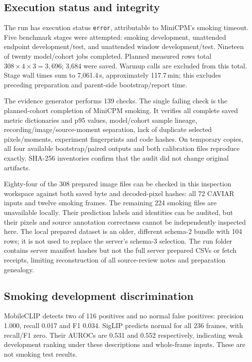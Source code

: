 \documentclass[11pt,a4paper]{article}
\newcommand{\code}[1]{\nolinkurl{#1}}
\begin{document}
\subsection{Execution status and integrity}
The run has execution status \code{error}, attributable to MiniCPM's smoking timeout. Five benchmark stages were attempted: smoking development, unattended endpoint development/test, and unattended window development/test. Nineteen of twenty model/cohort jobs completed. Planned measured rows total $308\times4\times3=3,696$; 3,684 were saved. Warmup calls are excluded from this total. Stage wall times sum to 7,061.4\,s, approximately 117.7\,min; this excludes preceding preparation and parent-side bootstrap/report time.

The evidence generator performs 139 checks. The single failing check is the planned-cohort completion of MiniCPM smoking. It verifies all complete saved metric dictionaries and p95 values, model/cohort sample lineage, recording/image/source-moment separation, lack of duplicate selected pixels/moments, experiment fingerprints and code hashes. On temporary copies, all four available bootstrap/paired outputs and both calibration files reproduce exactly. SHA-256 inventories confirm that the audit did not change original artifacts.

Eighty-four of the 308 prepared image files can be checked in this inspection workspace against both saved byte and decoded-pixel hashes: all 72 CAVIAR inputs and twelve smoking frames. The remaining 224 smoking files are unavailable locally. Their prediction labels and identities can be audited, but their pixels and source annotation correctness cannot be independently inspected here. The local prepared dataset is an older, different schema-2 bundle with 104 rows; it is not used to replace the server's schema-3 selection. The run folder contains server manifest hashes but not the full server prepared CSVs or fetch receipts, limiting reconstruction of all source-review notes and preparation genealogy.

\subsection{Smoking development discrimination}
MobileCLIP detects two of 116 positives and no normal false positives: precision 1.000, recall 0.017 and F1 0.034. SigLIP predicts normal for all 236 frames, with recall/F1 zero. Their AUROCs are 0.531 and 0.552 respectively, indicating weak development ranking under these descriptions and whole-frame inputs. These are not smoking test results.
\end{document}
